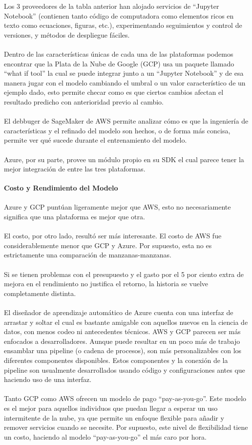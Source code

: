 \documentclass[12pt, a4paper, titlepage]{report}
\begin{document}
		\newpage
		Los 3 proveedores de la tabla anterior han alojado servicios de “Jupyter Notebook” (contienen tanto código de computadora como elementos ricos en texto como ecuaciones, figuras, etc.), experimentando seguimientos y control de versiones, y métodos de despliegue fáciles.\\
		\\
		Dentro de las características únicas de cada una de las plataformas podemos encontrar que la Plata de la Nube de Google (GCP) usa un paquete llamado “what if tool” la cual se puede integrar junto a un “Jupyter Notebook” y de esa manera jugar con el modelo cambiando el umbral o un valor característico de un ejemplo dado, esto permite checar como es que ciertos cambios afectan el resultado predicho con anterioridad previo al cambio.\\
		\\
		El debbuger de SageMaker de AWS permite analizar cómo es que la ingeniería de características y el refinado del modelo son hechos, o de forma más concisa, permite ver qué sucede durante el entrenamiento del modelo.\\
		\\
		Azure, por su parte, provee un módulo propio en su SDK el cual parece tener la mejor integración de entre las tres plataformas.\\
		\\
		\textbf{Costo y Rendimiento del Modelo}\\
		\\
		Azure y GCP puntúan ligeramente mejor que AWS, esto no necesariamente significa que una plataforma es mejor que otra.\\
		\\
		El costo, por otro lado, resultó ser más interesante. El costo de AWS fue considerablemente menor que GCP y Azure. Por supuesto, esta no es estrictamente una comparación de manzanas-manzanas.\\
		\\
		Si se tienen problemas con el presupuesto y el gasto por el 5 por ciento extra de mejora en el rendimiento no justifica el retorno, la historia se vuelve completamente distinta.\\
		\\
		El diseñador de aprendizaje automático de Azure cuenta con una interfaz de arrastar y soltar el cual es bastante amigable con aquellos nuevos en la ciencia de datos, con menos codeo ni antecedentes técnicos. AWS y GCP parecen ser más enfocados a desarrolladores. Aunque puede resultar en un poco más de trabajo ensamblar una pipeline (o cadena de procesos), son más personalizables con los diferentes componentes disponibles. Estos componentes y la conexión de la pipeline son usualmente desarrollados usando código y configuraciones antes que haciendo uso de una interfaz.\\
		\\
		Tanto GCP como AWS ofrecen un modelo de pago “pay-as-you-go”. Este modelo es el mejor para aquellos individuos que puedan llegar a esperar un uso intermitente de la nube, ya que permite un enfoque flexible para añadir y remover servicios cuando se necesite. Por supuesto, este nivel de flexibilidad tiene un costo, haciendo al modelo “pay-as-you-go” el más caro por hora.
		
\end{document}
